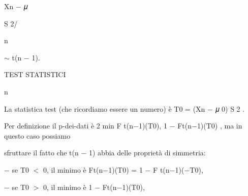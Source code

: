 \documentclass[a4paper,portrait,12pt]{article}
\begin{document}
\begin{flushleft}
Xn $-$ 𝜇
\end{flushleft}


\begin{flushleft}
S 2/
\end{flushleft}


\begin{flushleft}
n
\end{flushleft}





\begin{flushleft}
$\sim$ t(n $-$ 1).
\end{flushleft}










\begin{flushleft}
TEST STATISTICI
\end{flushleft}





\begin{flushleft}
n
\end{flushleft}





\begin{flushleft}
La statistica test (che ricordiamo essere un numero) \`{e} T0 = (Xn $-$ 𝜇 0) S 2 .
\end{flushleft}


\begin{flushleft}
Per definizione il p-dei-dati \`{e} 2 min F t(n$-$1)(T0), 1 $-$ Ft(n$-$1)(T0) , ma in questo caso possiamo
\end{flushleft}


\begin{flushleft}
sfruttare il fatto che t(n $-$ 1) abbia delle propriet\`{a} di simmetria:
\end{flushleft}


\begin{flushleft}
$-$ se T0 $<$ 0, il minimo \`{e} Ft(n$-$1)(T0) = 1 $-$ F t(n$-$1)($-$T0),
\end{flushleft}


\begin{flushleft}
$-$ se T0 $>$ 0, il minimo \`{e} 1 $-$ Ft(n$-$1)(T0),
\end{flushleft}
\end{document}

